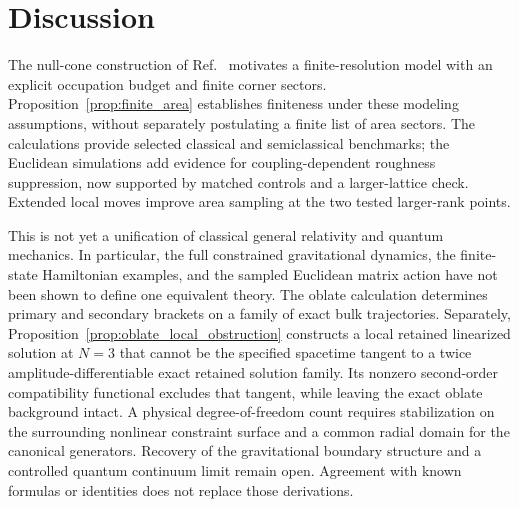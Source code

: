 \documentclass[onecolumn,11pt,aps,prd,amsmath,amssymb,nofootinbib,floatfix]{revtex4-2}
\begin{document}
\section{Discussion}\label{sec:discussion}

The null-cone construction of Ref.~\cite{Chandrasekaran2026} motivates a finite-resolution model with an explicit occupation budget and finite corner sectors. Proposition~\ref{prop:finite_area} establishes finiteness under these modeling assumptions, without separately postulating a finite list of area sectors. The calculations provide selected classical and semiclassical benchmarks; the Euclidean simulations add evidence for coupling-dependent roughness suppression, now supported by matched controls and a larger-lattice check. Extended local moves improve area sampling at the two tested larger-rank points.

This is not yet a unification of classical general relativity and quantum mechanics. In particular, the full constrained gravitational dynamics, the finite-state Hamiltonian examples, and the sampled Euclidean matrix action have not been shown to define one equivalent theory. The oblate calculation determines primary and secondary brackets on a family of exact bulk trajectories. Separately, Proposition~\ref{prop:oblate_local_obstruction} constructs a local retained linearized solution at $N=3$ that cannot be the specified spacetime tangent to a twice amplitude-differentiable exact retained solution family. Its nonzero second-order compatibility functional excludes that tangent, while leaving the exact oblate background intact. A physical degree-of-freedom count requires stabilization on the surrounding nonlinear constraint surface and a common radial domain for the canonical generators. Recovery of the gravitational boundary structure and a controlled quantum continuum limit remain open. Agreement with known formulas or identities does not replace those derivations.
\end{document}

